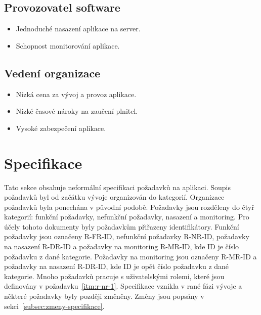 \subsection*{Provozovatel software}\label{subsec:provozovatel-spravce-software}

\begin{itemize}
    \item
    Jednoduché nasazení aplikace na server.
    \item
    Schopnost monitorování aplikace.
\end{itemize}

\subsection*{Vedení organizace}\label{subsec:vedeni-organizace}

\begin{itemize}
    \item
    Nízká cena za vývoj a provoz aplikace.
    \item
    Nízké časové nároky na zaučení plnitel.
    \item
    Vysoké zabezpečení aplikace.
\end{itemize}


\section{Specifikace}\label{sec:specifikace}

Tato sekce obsahuje neformální specifikaci požadavků na aplikaci.
Soupis požadavků byl od začátku vývoje organizován do kategorií.
Organizace požadavků byla ponechána v původní podobě.
Požadavky jsou rozděleny do čtyř kategorií: funkční požadavky, nefunkční požadavky, nasazení a monitoring.
Pro účely tohoto dokumenty byly požadavkům přiřazeny identifikátory.
Funkční požadavky jsou označeny R-FR-ID, nefunkční požadavky R-NR-ID, požadavky na nasazení R-DR-ID a požadavky na monitoring R-MR-ID, kde ID je číslo požadavku z dané kategorie.
Požadavky na monitoring jsou označeny R-MR-ID a požadavky na nasazení R-DR-ID, kde ID je opět číslo požadavku z dané kategorie.
Mnoho požadavků pracuje s uživatelskými rolemi, které jsou definovány v požadavku~\ref{itm:r-nr-1}.
Specifikace vznikla v rané fázi vývoje a některé požadavky byly později změněny.
Změny jsou popsány v sekci~\ref{subsec:zmeny-specifikace}.

